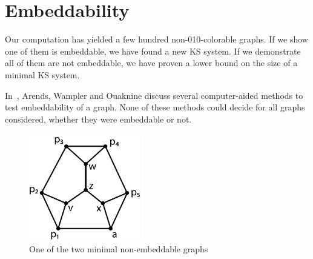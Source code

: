 \documentclass[adraft,copyright,creativecommons]{eptcs}
\theoremstyle{definition}
\theoremstyle{remark}
\begin{document}
\section{Embeddability}
Our computation has yielded a few hundred non-010-colorable graphs.
If we show one of them is embeddable, we have found a new KS system.
If we demonstrate all of them are not embeddable, we have
proven a lower bound on the size of a minimal KS system.

In~\cite{aow11}, Arends, Wampler and Ouaknine discuss several
computer-aided methods
to test embeddability of a graph.  None of these methods could decide
for all graphs considered, whether they were embeddable or not.

\label{sec:emb}
\begin{figure}
\begin{center}
\includegraphics[width=50mm]{../graphs/unemb10-1-a.pdf}
\end{center}
\caption{One of the two minimal
        non-embeddable graphs
\label{fig:unemb-10-2}}
\end{figure}
\end{document}
